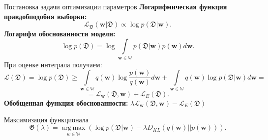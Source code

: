 \documentclass[9pt,pdf,hyperref={unicode}]{beamer}
\DeclareMathOperator*{\argmax}{arg\,max}
\begin{document}
\begin{frame}[shrink=5]{Постановка задачи оптимизации параметров}
    \textbf{Логарифмическая функция правдобподобия выборки:}
		\begin{equation*}
            \mathcal{L}_\mathfrak{D}(\mathbf{w}|\mathfrak{D}) \propto \log p(\mathfrak{D}|\mathbf{w}).
        \end{equation*}	
    \textbf{Логарифм обоснованности модели:}
        \begin{equation*}
            \log p(\mathfrak{D}) = \log \int\limits_{\mathbf{w}\in \mathbb{W}} p(\mathfrak{D}|\mathbf{w})p(\mathbf{w}) d\mathbf{w}.
        \end{equation*}
    При оценке интеграла получаем:
    \begin{equation*}
        \mathcal{L}(\mathfrak{D}) = \log p(\mathfrak{D}) \geq \int\limits_{\mathbf{w}\in \mathbb{W}} q(\mathbf{w}) \log \frac{p(\mathbf{w})}{q(\mathbf{w})}d\mathbf{w} + \int\limits_{\mathbf{w}\in \mathbb{W}} q(\mathbf{w}) \log p(\mathfrak{D}|\mathbf{w})d\mathbf{w} =
    \end{equation*}
    \begin{equation*}
     = \mathcal{L}_{\mathbf{w}}(\mathfrak{D}, \mathbf{w}) + \mathcal{L}_E (\mathfrak{D}).
    \end{equation*}
    \textbf{Обобщенная функция обоснованности:}
    $ \lambda\mathcal{L}_{\mathbf{w}}(\mathfrak{D}, \mathbf{w}) - \mathcal{L}_E (\mathfrak{D})$
    \begin{block}{Максимизация функционала} 
       \begin{equation*}
            \label{nohyper}
            \mathfrak{G}(\lambda) = \argmax\limits_{w \in \mathbb{W}} ( \log p(\mathfrak{D}| \mathbf{w})  - \lambda D_{KL}(q(\mathbf{w})||p(\mathbf{w})) ).
        \end{equation*}
    \end{block}
    
    
\end{frame}
\end{document}
